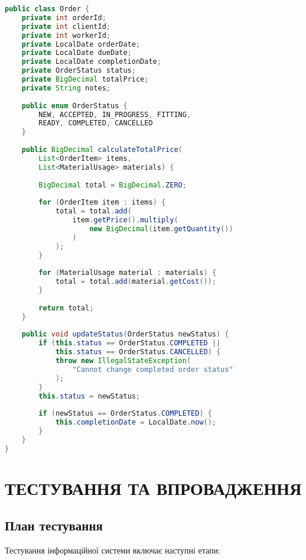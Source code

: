 \documentclass[14pt,a4paper]{extarticle}
\begin{document}
\begin{lstlisting}[language=Java, caption=Клас Order, basicstyle=\small\ttfamily, breaklines=true, frame=single]
public class Order {
    private int orderId;
    private int clientId;
    private int workerId;
    private LocalDate orderDate;
    private LocalDate dueDate;
    private LocalDate completionDate;
    private OrderStatus status;
    private BigDecimal totalPrice;
    private String notes;
    
    public enum OrderStatus {
        NEW, ACCEPTED, IN_PROGRESS, FITTING, 
        READY, COMPLETED, CANCELLED
    }
    
    public BigDecimal calculateTotalPrice(
        List<OrderItem> items, 
        List<MaterialUsage> materials) {
        
        BigDecimal total = BigDecimal.ZERO;
        
        for (OrderItem item : items) {
            total = total.add(
                item.getPrice().multiply(
                    new BigDecimal(item.getQuantity())
                )
            );
        }
        
        for (MaterialUsage material : materials) {
            total = total.add(material.getCost());
        }
        
        return total;
    }
    
    public void updateStatus(OrderStatus newStatus) {
        if (this.status == OrderStatus.COMPLETED || 
            this.status == OrderStatus.CANCELLED) {
            throw new IllegalStateException(
                "Cannot change completed order status"
            );
        }
        this.status = newStatus;
        
        if (newStatus == OrderStatus.COMPLETED) {
            this.completionDate = LocalDate.now();
        }
    }
}
\end{lstlisting}

\newpage
\section{ТЕСТУВАННЯ ТА ВПРОВАДЖЕННЯ}

\subsection{План тестування}

Тестування інформаційної системи включає наступні етапи:
\end{document}
